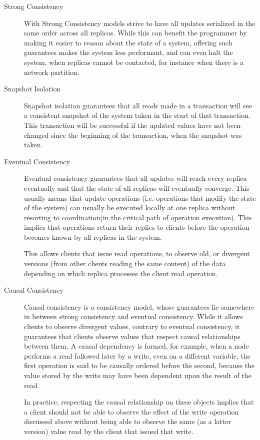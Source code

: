 \begin{description}
  \item[Strong Consistency] With Strong Consistency models strive to have all updates serialized in the same order across all replicas. While this can benefit the programmer by making it easier to reason about the state of a system, offering such guarantees makes the system less performant, and can even halt the system, when replicas cannot be contacted, for instance when there is a network partition.
  
  \item[Snapshot Isolation] Snapshot isolation\cite{snapshot_integrity} guarantees that all reads made in a transaction will see a consistent snapshot of the system taken in the start of that transaction. This transaction will be successful if the updated values have not been changed since the beginning of the transaction, when the snapshot was taken.
  
  \item[Eventual Consistency] Eventual consistency\cite{eventual} guarantees that all updates will reach every replica eventually and that the state of all replicas will eventually converge. This usually means that update operations (i.e. operations that modify the state of the system) can usually be executed locally at one replica without resorting to coordination(in the critical path of operation execution). This implies that operations return their replies to clients before the operation becomes known by all replicas in the system.\par
	This allows clients that issue read operations, to observe old, or divergent versions (from other clients reading the same content) of the data depending on which replica processes the client read operation.
	
  \item[Causal Consistency] Causal consistency is a consistency model, whose guarantees lie somewhere in between strong consistency and eventual consistency. While it allows clients to observe divergent values, contrary to eventual consistency, it guarantees that clients observe values that respect causal relationships between them\cite{chainreaction, lamport_time}. A causal dependency is formed, for example, when a node performs a read followed later by a write, even on a different variable, the first operation is said to be causally ordered before the second, because the value stored by the write may have been dependent upon the result of the read.\par
  In practice, respecting the causal relationship on these objects implies that a client should not be able to observe the effect of the write operation discussed above without being able to observe the same (as a latter version) value read by the client that issued that write.
\end{description}

